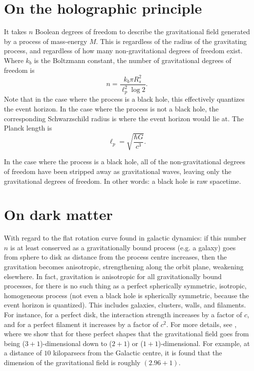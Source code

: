 \documentclass[12pt]{article}
\begin{document}
\section{On the holographic principle}

It takes $n$ Boolean degrees of freedom to describe the gravitational field \cite{hooft, susskind} generated by a process of mass-energy $M$.
This is regardless of the radius of the gravitating process, and regardless of how many non-gravitational degrees of freedom exist.
Where $k_b$ is the Boltzmann constant, the number of gravitational degrees of freedom is
\begin{equation}
n = \frac{k_b \pi R_s^2}{ \ell_p^2 \log 2}.
\end{equation}
Note that in the case where the process is a black hole, this effectively quantizes the event horizon.
In the case where the process is not a black hole, the corresponding Schwarzschild radius is where the event horizon would lie at.
The Planck length is
\begin{equation}
\ell_p = \sqrt{\frac{\hbar G}{c^3}}.
\end{equation}

In the case where the process is a black hole, all of the non-gravitational degrees of freedom have been stripped away as gravitational waves, leaving only the gravitational degrees of freedom.
In other words: a black hole is raw spacetime.






\section{On dark matter}

With regard to the flat rotation curve found in galactic dynamics: if this number $n$ is at least conserved as a gravitationally bound process (e.g. a galaxy) goes from sphere to disk as distance from the process centre increases, then the gravitation becomes anisotropic, strengthening along the orbit plane, weakening elsewhere.
In fact, gravitation is anisotropic for all gravitationally bound processes, for there is no such thing as a perfect spherically symmetric, isotropic, homogeneous process (not even a black hole is spherically symmetric, because the event horizon is quantized).
This includes galaxies, clusters, walls, and filaments.
For instance, for a perfect disk, the interaction strength increases by a factor of $c$, and for a perfect filament it increases by a factor of $c^2$.
For more details, see \cite{halayka}, where we show that for these perfect shapes that the gravitational field goes from being ($3+1$)-dimensional down to ($2+1$) or ($1+1$)-dimensional.
For example, at a distance of $10$ kiloparsecs from the Galactic centre, it is found that the dimension of the gravitational field is roughly $(2.96 + 1)$.
\end{document}
